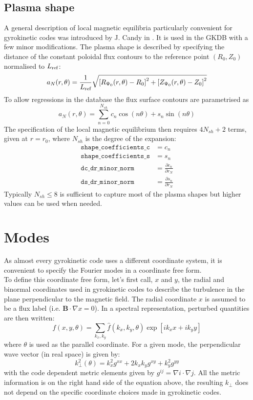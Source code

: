 \documentclass[a4paper]{report}
\begin{document}
\subsection{Plasma shape} \label{sec:shape:coefficients}
A general description of local magnetic equilibria particularly convenient for gyrokinetic codes was introduced by J. Candy in \cite {Candy:PPCF2009}. It is used in the GKDB with a few minor modifications.
The plasma shape is described by specifying the distance of the constant poloidal flux contours to the reference point $(R_0,Z_0)$  normalised to $L_{\textrm{ref}}$:
$$ a_N(r,\theta) = \frac{1}{L_{\textrm{ref}}}\sqrt{\left[R_{\Psi_0}(r,\theta)-R_0\right]^2 + \left[Z_{\Psi_0}(r,\theta)-Z_0\right]^2} $$
To allow regressions in the database the flux surface contours are parametrised as 
$$ a_N(r,\theta) = \sum_{n=0}^{N_{sh}} c_n \cos(n\theta) + s_n \sin(n\theta) $$
The specification of the local magnetic equilibrium then requires $4N_{sh}+2$ terms, given at $r=r_0$, where $N_{sh}$ is the degree of the expansion: 
\begin{align*}
\texttt{shape\_coefficients\_c} & = c_n \\
\texttt{shape\_coefficients\_s} & = s_n \\
\texttt{dc\_dr\_minor\_norm} & = \frac{\partial c_n}{\partial r_N} \\
\texttt{ds\_dr\_minor\_norm} & = \frac{\partial s_n}{\partial r_N} 
\end{align*}
Typically $N_{sh}\leq8$ is sufficient to capture most of the plasma shapes but higher values can be used when needed.

\section{Modes}
As almost every gyrokinetic code uses a different coordinate system, it is convenient to specify the Fourier modes in a coordinate free form.\\
To define this coordinate free form, let's first call, $x$ and $y$, the radial and binormal coordinates used in gyrokinetic codes to describe the turbulence in the plane perpendicular to the magnetic field. The radial coordinate $x$ is assumed to be a flux label (i.e. $\mathbf{B}\cdot \nabla x =0$).
In a spectral representation, perturbed quantities are then written:
\begin{equation}
 f(x,y,\theta) = \sum_{k_x,k_y} \hat{f}(k_x,k_y,\theta)\exp[ik_x x + ik_y y] 
\end{equation}
where $\theta$ is used as the parallel coordinate.
For a given mode, the perpendicular wave vector (in real space) is given by:
\begin{equation}
 k_\perp^2(\theta) = k_x^2 g^{xx} + 2k_xk_y g^{xy} + k_y^2g^{yy}
\end{equation}
with the code dependent metric elements given by $g^{ij}=\nabla i \cdot \nabla j$. All the metric information is on the right hand side of the equation above, the resulting $k_\perp$ does not depend on the specific coordinate choices made in gyrokinetic codes.
\end{document}
